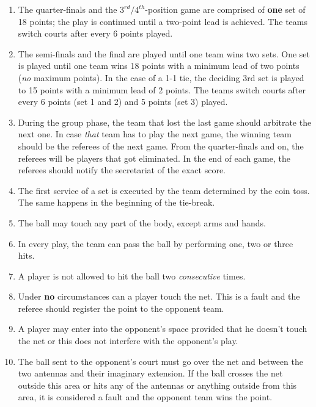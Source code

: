 \documentclass[a4paper,11pt]{article}
\begin{document}
\begin{enumerate}
\item The quarter-finals and the $3^{rd}/4^{th}$-position game are comprised of
  \textbf{one} set of 18 points; the play is continued until a two-point lead is
  achieved. The teams switch courts after every 6 points played.

\item The semi-finals and the final are played until one team wins two sets. One
  set is played until one team wins 18 points with a minimum lead of two points
  (\textit{no} maximum points). In the case of a 1-1 tie, the deciding 3rd set
  is played to 15 points with a minimum lead of 2 points. The teams switch
  courts after every 6 points (set 1 and 2) and 5 points (set 3) played.

\item During the group phase, the team that lost the last game should arbitrate
  the next one. In case \textit{that} team has to play the next game, the
  winning team should be the referees of the next game. From the quarter-finals
  and on, the referees will be players that got eliminated. In the end of each
  game, the referees should notify the secretariat of the exact score.

\item The first service of a set is executed by the team determined by the coin
  toss. The same happens in the beginning of the tie-break.

\item The ball may touch any part of the body, except arms and hands.

\item In every play, the team can pass the ball by performing one, two or three
  hits.

\item A player is not allowed to hit the ball two \textit{consecutive} times.

\item Under \textbf{no} circumstances can a player touch the net. This is a
  fault and the referee should register the point to the opponent team.

\item A player may enter into the opponent’s space provided that he doesn't
  touch the net or this does not interfere with the opponent’s play.

\item The ball sent to the opponent’s court must go over the net and between the
  two antennas and their imaginary extension. If the ball crosses the net
  outside this area or hits any of the antennas or anything outside from this
  area, it is considered a fault and the opponent team wins the point.


\end{enumerate}
\end{document}
